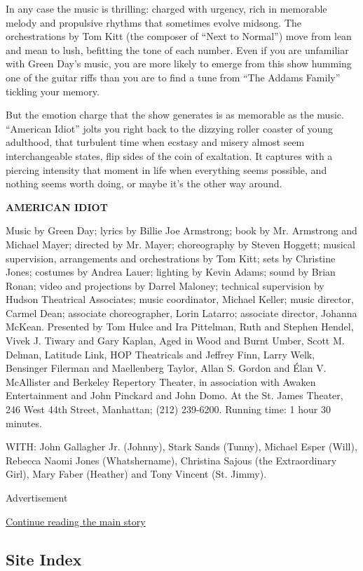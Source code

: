 In any case the music is thrilling: charged with urgency, rich in
memorable melody and propulsive rhythms that sometimes evolve midsong.
The orchestrations by Tom Kitt (the composer of ``Next to Normal'') move
from lean and mean to lush, befitting the tone of each number. Even if
you are unfamiliar with Green Day's music, you are more likely to emerge
from this show humming one of the guitar riffs than you are to find a
tune from ``The Addams Family'' tickling your memory.

But the emotion charge that the show generates is as memorable as the
music. ``American Idiot'' jolts you right back to the dizzying roller
coaster of young adulthood, that turbulent time when ecstasy and misery
almost seem interchangeable states, flip sides of the coin of
exaltation. It captures with a piercing intensity that moment in life
when everything seems possible, and nothing seems worth doing, or maybe
it's the other way around.

\textbf{AMERICAN IDIOT}

Music by Green Day; lyrics by Billie Joe Armstrong; book by Mr.
Armstrong and Michael Mayer; directed by Mr. Mayer; choreography by
Steven Hoggett; musical supervision, arrangements and orchestrations by
Tom Kitt; sets by Christine Jones; costumes by Andrea Lauer; lighting by
Kevin Adams; sound by Brian Ronan; video and projections by Darrel
Maloney; technical supervision by Hudson Theatrical Associates; music
coordinator, Michael Keller; music director, Carmel Dean; associate
choreographer, Lorin Latarro; associate director, Johanna McKean.
Presented by Tom Hulce and Ira Pittelman, Ruth and Stephen Hendel, Vivek
J. Tiwary and Gary Kaplan, Aged in Wood and Burnt Umber, Scott M.
Delman, Latitude Link, HOP Theatricals and Jeffrey Finn, Larry Welk,
Bensinger Filerman and Maellenberg Taylor, Allan S. Gordon and Élan V.
McAllister and Berkeley Repertory Theater, in association with Awaken
Entertainment and John Pinckard and John Domo. At the St. James Theater,
246 West 44th Street, Manhattan; (212) 239-6200. Running time: 1 hour 30
minutes.

WITH: John Gallagher Jr. (Johnny), Stark Sands (Tunny), Michael Esper
(Will), Rebecca Naomi Jones (Whatshername), Christina Sajous (the
Extraordinary Girl), Mary Faber (Heather) and Tony Vincent (St. Jimmy).

Advertisement

\protect\hyperlink{after-bottom}{Continue reading the main story}

\hypertarget{site-index}{%
\subsection{Site Index}\label{site-index}}

